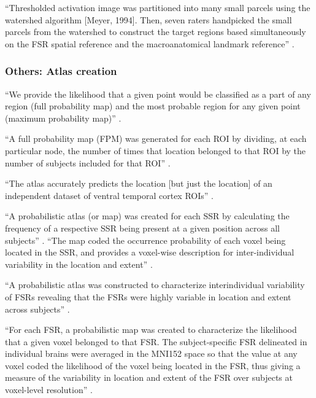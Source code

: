 %
``Thresholded activation image was partitioned into many small parcels using the
watershed algorithm [Meyer, 1994].
%
Then, seven raters handpicked the small parcels from the watershed to construct
the target regions based simultaneously on the FSR spatial reference and the
macroanatomical landmark reference'' \citep{zhen2015quantifying}.





\subsubsection{Others: Atlas creation}


``We provide the likelihood that a given point would be classified as a part of
any region (full probability map) and the most probable region for any given
point (maximum probability map)'' \citep{wang2015probabilistic}.

``A full probability map (FPM) was generated for each ROI by dividing, at each
particular node, the number of times that location belonged to that ROI by the
number of subjects included for that ROI'' \citep{wang2015probabilistic}.

``The atlas accurately predicts the location [but just the location] of an
independent dataset of ventral temporal cortex ROIs''
\citep{rosenke2021probabilistic}.


``A probabilistic atlas (or map) was created for each SSR by calculating the
frequency of a respective SSR being present at a given position across all
subjects'' \citep{zhen2017quantifying}.
%
``The map coded the occurrence probability of each voxel being located in the
SSR, and provides a voxel-wise description for inter-individual variability in
the location and extent'' \citep{zhen2017quantifying}.


%
``A probabilistic atlas was constructed to characterize interindividual
variability of FSRs revealing that the FSRs were highly variable in location and
extent across subjects'' \citep{zhen2015quantifying}.

%
``For each FSR, a probabilistic map was created to characterize the likelihood
that a given voxel belonged to that FSR.
%
The subject-specific FSR delineated in individual brains were averaged in the
MNI152 space so that the value at any voxel coded the likelihood of the voxel
being located in the FSR, thus giving a measure of the variability in location
and extent of the FSR over subjects at voxel-level resolution''
\citep{zhen2015quantifying}.

